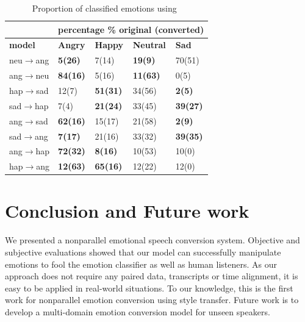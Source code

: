 \documentclass{article}
\begin{document}
\begin{table}[htb]
\centering
\caption{Proportion of classified emotions using~\cite{mirsamadi2017automatic}}
\begin{tabular}{|l|l|l|l|l|}
\hline
& \multicolumn{4}{c|}{\textbf{percentage \% original (converted)}} \\ \hline
\textbf{model}   & \textbf{Angry}      & \textbf{Happy}    & \textbf{Neutral}  & \textbf{Sad}   \\ \hline\hline
neu$\rightarrow$ang       & \textbf{5(26)}     & 7(14)   & \textbf{19(9)}  & 70(51)   \\ \hline
ang$\rightarrow$neu       & \textbf{84(16)}    & 5(16)   & \textbf{11(63)} & 0(5)     \\ \hline
\hline
hap$\rightarrow$sad       & 12(7)     & \textbf{51(31)}  & 34(56) & \textbf{2(5)}     \\ \hline
sad$\rightarrow$hap       & 7(4)      & \textbf{21(24)}  & 33(45) & \textbf{39(27)}   \\ \hline
\hline
ang$\rightarrow$sad       & \textbf{62(16)}    & 15(17)  & 21(58)  & \textbf{2(9)}   \\ \hline
sad$\rightarrow$ang       & \textbf{7(17)}    & 21(16)  & 33(32)  & \textbf{39(35)}   \\ \hline
\hline
ang$\rightarrow$hap       & \textbf{72(32)}      & \textbf{8(16)}   & 10(53)    & 10(0)   \\ \hline
hap$\rightarrow$ang       & \textbf{12(63)}      & \textbf{65(16)}    & 12(22)    & 12(0)   \\ \hline
\end{tabular}%
\label{tab:emo}
\end{table}



\section{Conclusion and Future work}
\label{sec:con}
We presented a nonparallel emotional speech conversion system. Objective and subjective evaluations showed that our model can successfully manipulate emotions to fool the emotion classifier as well as human listeners. As our approach does not require any paired data, transcripts or time alignment, it is easy to be applied in real-world situations. To our knowledge, this is the first work for nonparallel emotion conversion using style transfer. Future work is to develop a multi-domain emotion conversion model for unseen speakers.
\end{document}
